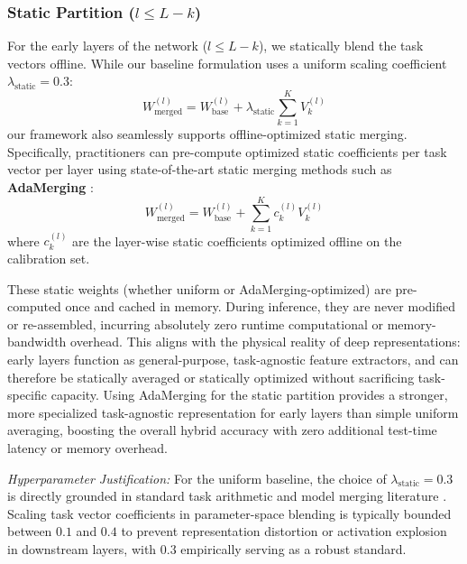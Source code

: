 \subsubsection{Static Partition ($l \le L-k$)}
For the early layers of the network ($l \le L-k$), we statically blend the task vectors offline. While our baseline formulation uses a uniform scaling coefficient $\lambda_{\text{static}} = 0.3$:
\begin{equation}
    W_{\text{merged}}^{(l)} = W_{\text{base}}^{(l)} + \lambda_{\text{static}} \sum_{k=1}^K V_k^{(l)}
\end{equation}
our framework also seamlessly supports offline-optimized static merging. Specifically, practitioners can pre-compute optimized static coefficients per task vector per layer using state-of-the-art static merging methods such as \textbf{AdaMerging} \cite{adamerging}:
\begin{equation}
    W_{\text{merged}}^{(l)} = W_{\text{base}}^{(l)} + \sum_{k=1}^K c_k^{(l)} V_k^{(l)}
\end{equation}
where $c_k^{(l)}$ are the layer-wise static coefficients optimized offline on the calibration set.

These static weights (whether uniform or AdaMerging-optimized) are pre-computed once and cached in memory. During inference, they are never modified or re-assembled, incurring absolutely zero runtime computational or memory-bandwidth overhead. This aligns with the physical reality of deep representations: early layers function as general-purpose, task-agnostic feature extractors, and can therefore be statically averaged or statically optimized without sacrificing task-specific capacity. Using AdaMerging for the static partition provides a stronger, more specialized task-agnostic representation for early layers than simple uniform averaging, boosting the overall hybrid accuracy with zero additional test-time latency or memory overhead.

\textit{Hyperparameter Justification:} For the uniform baseline, the choice of $\lambda_{\text{static}} = 0.3$ is directly grounded in standard task arithmetic and model merging literature \cite{ilharco2022editing, adamerging}. Scaling task vector coefficients in parameter-space blending is typically bounded between $0.1$ and $0.4$ to prevent representation distortion or activation explosion in downstream layers, with $0.3$ empirically serving as a robust standard.

